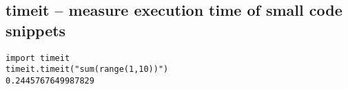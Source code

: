 \subsection{timeit -- measure execution time of small code snippets}
\begin{verbatim}
import timeit
timeit.timeit("sum(range(1,10))")
0.2445767649987829
\end{verbatim}
